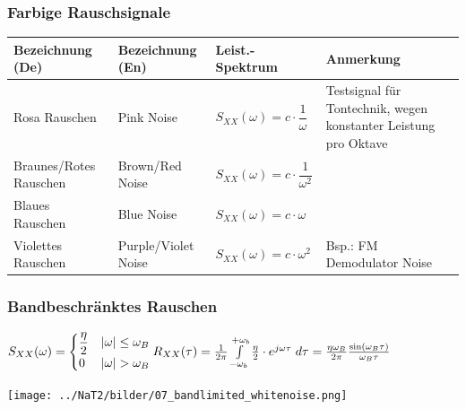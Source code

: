 \subsubsection{Farbige Rauschsignale}
\renewcommand{\arraystretch}{2}
\begin{tabular}[c]{ | p{4cm} | p{3.5cm} | p{3cm} | p{6cm} | }
	\hline
		\textbf{Bezeichnung (De)}
		& \textbf{Bezeichnung (En)}
		& \textbf{Leist.-Spektrum}
		& \textbf{Anmerkung} \\
	\hline
		Rosa Rauschen
		& Pink Noise
		& $S_{XX}(\omega) = c \cdot \dfrac{1}{\omega}$
		& Testsignal für Tontechnik, wegen konstanter Leistung pro Oktave \\
	\hline
		Braunes/Rotes Rauschen
		& Brown/Red Noise
		&	$S_{XX}(\omega) = c \cdot \dfrac{1}{\omega^2}$
		& \\
	\hline
		Blaues Rauschen
		& Blue Noise
		&	$S_{XX}(\omega) = c \cdot \omega$
		& \\
	\hline
		Violettes Rauschen
		& Purple/Violet Noise
		&	$S_{XX}(\omega) = c \cdot \omega^2$
		& Bsp.: FM Demodulator Noise\\
    \hline
\end{tabular}
\renewcommand{\arraystretch}{1}

\subsubsection{Bandbeschränktes Rauschen }
\begin{center}
	\begin{minipage}{8cm}
		$S_{XX}(\omega) = \begin{cases}
                      \dfrac{\eta}{2} & |\omega| \leq \omega_B \\
                      0 & |\omega| > \omega_B
                      \end{cases} \\ \\
		R_{XX}(\tau) =  \frac{1}{2\pi} \int\limits_{-\omega_{b}}^{+\omega_{b}}
                                           \frac{\eta}{2}  \cdot e^{j\omega\tau}\; d\tau
                      = \frac{\eta\omega_{B}}{2\pi} \frac{\sin(\omega_{B}\tau)}{\omega_{B}\tau}$
  	\end{minipage}
	\begin{minipage}{10cm}
		\texttt{[image: ../NaT2/bilder/07\_bandlimited\_whitenoise.png]}
  	\end{minipage}
\end{center}

